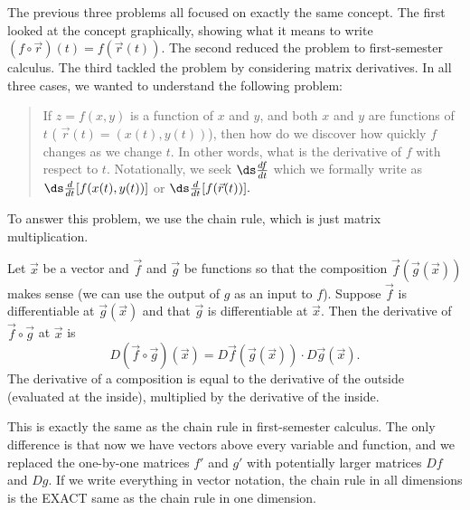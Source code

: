 


The previous three problems all focused on exactly the same concept.  The first looked at the concept graphically, showing  what it means to write $(f\circ \vec r)(t)=f(\vec r(t))$. The second reduced the problem to first-semester calculus. The third tackled the problem by considering matrix derivatives.  In all three cases, we wanted to understand the following problem:
\begin{quote}
 If $z=f(x,y)$ is a function of $x$ and $y$, and both $x$ and $y$ are functions of $t$ ( $\vec r(t)=(x(t),y(t))$), then how do we discover how quickly $f$ changes as we change $t$. In other words, what is the derivative of $f$ with respect to $t$. Notationally, we seek $\ds \frac{df}{dt}$ which we formally write as $\ds \frac{d}{dt}[f(x(t),y(t))]$ or $\ds \frac{d}{dt} [f(\vec r(t))].$
\end{quote}
To answer this problem, we use the chain rule, which is just matrix multiplication.
\begin{theorem}\label{def:chain rule}
 Let $\vec x$ be a vector and $\vec f$ and $\vec g$ be functions so that the composition $\vec f(\vec g(\vec x))$ makes sense (we can use the output of $g$ as an input to $f$). Suppose $\vec f$ is differentiable at $\vec g(\vec x)$ and that $\vec g$ is differentiable at $\vec x$. Then the derivative of $\vec f\circ \vec g$ at $\vec x$ is 
$$D(\vec f\circ \vec g)(\vec x) = D\vec f(\vec g(\vec x))\cdot D\vec g(\vec x).$$
 The derivative of a composition is equal to the derivative of the outside (evaluated at the inside), multiplied by the derivative of the inside.  
\end{theorem}
This is exactly the same as the chain rule in first-semester calculus.  The only difference is that now we have vectors above every variable and function, and we replaced the one-by-one matrices $f'$ and $g'$ with potentially larger matrices $Df$ and $Dg$. If we write everything in vector notation, the chain rule in all dimensions is the EXACT same as the chain rule in one dimension.

